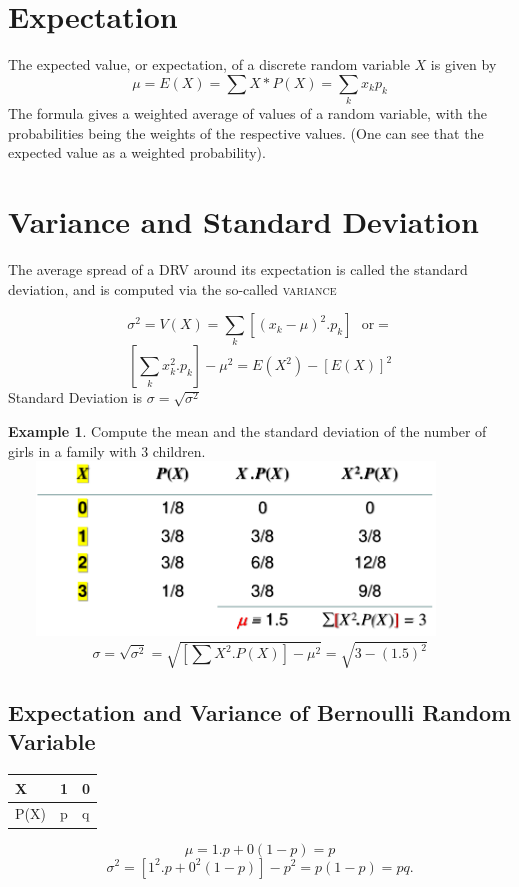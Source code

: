 \documentclass[12pt]{article}
\theoremstyle{definition}
\newtheorem{exmp}{Example}[section]
\begin{document}
\section{Expectation}
The expected value, or expectation, of a discrete random variable $X$ is given by
\[
    \displaystyle \mu = E(X) = \sum X *P(X) = \sum_k x_k p_k
\]
The formula gives a weighted average of values
of a random variable, with the probabilities being
the weights of the respective values.
(One can see that the expected value as a weighted probability).
\section{Variance and Standard Deviation}
The average spread of a DRV around its expectation is called the standard
deviation, and is computed via the so-called \textsc{variance}

\[
    \displaystyle \sigma^2 = V(X) = \sum_k  [(x_k -\mu)^2.p_k]\ \ \  \text{or} = 
    \]  
\[
    \displaystyle [\sum_k x^2_k.p_k] - \mu^2 = E(X^2) - [E(X)]^2
\]
Standard Deviation is $\sigma = \sqrt{\sigma^2}$
\begin{exmp}
     Compute the mean and the standard deviation of the number of girls in a family with 3 children.\\

    \ \ \ \   \includegraphics[width=400px]{4.png}
    \[
        \sigma = \sqrt{\sigma^2} = \sqrt{[\sum X^2.P(X)]- \mu^2} = \sqrt{3-(1.5)^2}
    \]
\end{exmp}
\subsection{Expectation and Variance of Bernoulli Random Variable}
\begin{longtable}[c]{l|l|l}
X    &  1   & 0   \\ \hline 
\endfirsthead
%
\endhead
%
P(X) & p&  q
\end{longtable}
\[
    \mu = 1.p + 0(1-p) = p
\]
\[
    \sigma^2 = [1^2.p + 0^2(1-p)] - p^2 = p(1-p) = pq.
\]
\end{document}
